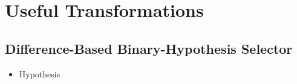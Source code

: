 \documentclass[onecolumn]{ctexart}
\begin{document}
\vspace{30pt}
\section{Useful Transformations}
\label{sec:useful_transformations}



\vspace{30pt}
\subsection{Difference-Based Binary-Hypothesis Selector}

\begin{itemize}
    \item  Hypothesis
    \begin{itemize}




            



\end{itemize}
\end{itemize}
\end{document}
